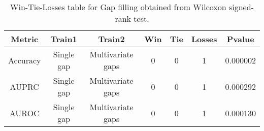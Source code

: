 \begin{table}[H]
\centering
\begin{tabular}{|c|c|c|c|c|c|c|}

\textbf{Metric} & \textbf{Train1} &    \textbf{Train2} &  \textbf{Win} &  \textbf{Tie} &  \textbf{Losses} &  \textbf{Pvalue} \\
\hline

       Accuracy &      Single gap &  Multivariate gaps &             0 &             0 &                1 &         0.000002 \\
\hline
          AUPRC &      Single gap &  Multivariate gaps &             0 &             0 &                1 &         0.000292 \\
\hline
          AUROC &      Single gap &  Multivariate gaps &             0 &             0 &                1 &         0.000130 \\
\hline

\end{tabular}
\caption{Win-Tie-Losses table for Gap filling obtained from Wilcoxon signed-rank test.}
\label{tab:gap_filling_training_data_comparison}
\end{table}
